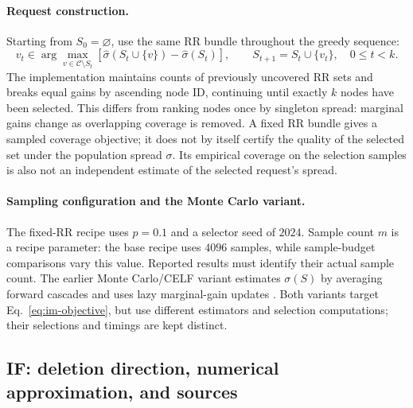 \paragraph{Request construction.}
Starting from $S_0=\varnothing$, use the same RR bundle throughout the greedy sequence:
\begin{equation}
v_t\in\arg\max_{v\in\mathcal C\setminus S_t}
\left[\widehat{\sigma}(S_t\cup\{v\})-\widehat{\sigma}(S_t)\right],
\qquad S_{t+1}=S_t\cup\{v_t\},\quad 0\le t<k.
\label{eq:rr-greedy}
\end{equation}
The implementation maintains counts of previously uncovered RR sets and breaks equal gains by ascending node ID, continuing until exactly $k$ nodes have been selected. This differs from ranking nodes once by singleton spread: marginal gains change as overlapping coverage is removed. A fixed RR bundle gives a sampled coverage objective; it does not by itself certify the quality of the selected set under the population spread $\sigma$. Its empirical coverage on the selection samples is also not an independent estimate of the selected request's spread.

\paragraph{Sampling configuration and the Monte Carlo variant.}
The fixed-RR recipe uses $p=0.1$ and a selector seed of $2024$. Sample count $m$ is a recipe parameter: the base recipe uses $4096$ samples, while sample-budget comparisons vary this value. Reported results must identify their actual sample count. The earlier Monte Carlo/CELF variant estimates $\sigma(S)$ by averaging forward cascades and uses lazy marginal-gain updates \citep{leskovec2007cost}. Both variants target Eq.~\ref{eq:im-objective}, but use different estimators and selection computations; their selections and timings are kept distinct.

\subsection{IF: deletion direction, numerical approximation, and sources}
\label{app:if-details}

